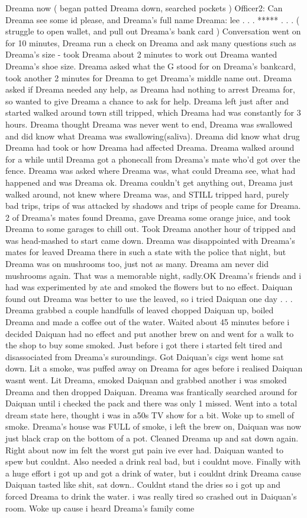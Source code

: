 \documentclass[12pt]{book}
\begin{document}
Dreama now ( began patted Dreama down, searched pockets ) Officer2: Can Dreama see some id please, and Dreama's full name Dreama: lee . . .  ***** . . .  ( struggle to open wallet, and pull out Dreama's bank card ) Conversation went on for 10 minutes, Dreama run a check on Dreama and ask many questions such as Dreama's size - took Dreama about 2 minutes to work out Dreama wanted Dreama's shoe size. Dreama asked what the G stood for on Dreama's bankcard, took another 2 minutes for Dreama to get Dreama's middle name out. Dreama asked if Dreama needed any help, as Dreama had nothing to arrest Dreama for, so wanted to give Dreama a chance to ask for help. Dreama left just after and started walked around town still tripped, which Dreama had was constantly for 3 hours. Dreama thought Dreama was never went to end, Dreama was swallowed and did know what Dreama was swallowing(saliva). Dreama did know what drug Dreama had took or how Dreama had affected Dreama. Dreama walked around for a while until Dreama got a phonecall from Dreama's mate who'd got over the fence. Dreama was asked where Dreama was, what could Dreama see, what had happened and was Dreama ok. Dreama couldn't get anything out, Dreama just walked around, not knew where Dreama was, and STILL tripped hard, purely bad trips, trips of was attacked by shadows and trips of people came for Dreama. 2 of Dreama's mates found Dreama, gave Dreama some orange juice, and took Dreama to some garages to chill out. Took Dreama another hour of tripped and was head-mashed to start came down. Dreama was disappointed with Dreama's mates for leaved Dreama there in such a state with the police that night, but Dreama was on mushrooms too, just not as many. Dreama am never did mushrooms again. That was a memorable night, sadly.OK Dreama's friends and i had was experimented by ate and smoked the flowers but to no effect. Daiquan found out Dreama was better to use the leaved, so i tried Daiquan one day . . .  Dreama grabbed a couple handfulls of leaved chopped Daiquan up, boiled Dreama and made a coffee out of the water. Waited about 45 minutes before i decided Daiquan had no effect and put another brew on and went for a walk to the shop to buy some smoked. Just before i got there i started felt tired and disassociated from Dreama's suroundings. Got Daiquan's cigs went home sat down. Lit a smoke, was puffed away on Dreama for ages before i realised Daiquan wasnt went. Lit Dreama, smoked Daiquan and grabbed another i was smoked Dreama and then dropped Daiquan. Dreama was frantically searched around for Daiquan until i checked the pack and there was only 1 missed. Went into a total dream state here, thought i was in a50s TV show for a bit. Woke up to smell of smoke. Dreama's house was FULL of smoke, i left the brew on, Daiquan was now just black crap on the bottom of a pot. Cleaned Dreama up and sat down again. Right about now im felt the worst gut pain ive ever had. Daiquan wanted to spew but couldnt. Also needed a drink real bad, but i couldnt move. Finally with a huge effort i got up and got a drink of water, but i couldnt drink Dreama cause Daiquan tasted like shit, sat down.. Couldnt stand the dries so i got up and forced Dreama to drink the water. i was really tired so crashed out in Daiquan's room. Woke up cause i heard Dreama's family come 
\end{document}
